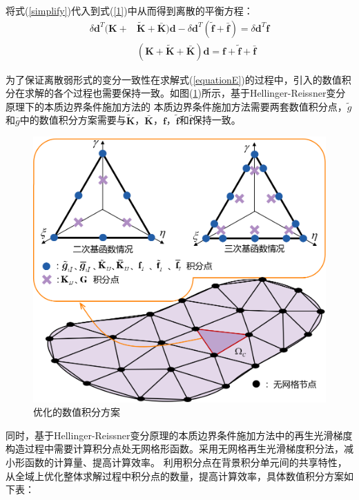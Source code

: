 将式(\ref{simplify})代入到式(\ref{1})中从而得到离散的平衡方程：
\begin{equation}\label{equationE}
\begin{split}
    \delta\pmb{d}^T(\pmb{K}+&\tilde{\pmb{K}}+\bar{\pmb{K}})\pmb{d}-\delta\pmb{d}^T(\tilde{\pmb{f}}+\bar{\pmb{f}})=\delta\pmb{d}^T\pmb{f}\\
    &(\pmb{K}+\pmb{\tilde{K}}+\pmb{\bar{K}})\pmb{d}=\pmb{f}+\tilde{\pmb{f}}+\bar{\pmb{f}}
\end{split}
\end{equation}\par
为了保证离散弱形式的变分一致性在求解式(\ref{equationE})的过程中，引入的数值积分在求解的各个过程也需要保持一致。如图(\ref{strain})所示，基于Hellinger-Reissner变分原理下的本质边界条件施加方法的
本质边界条件施加方法需要两套数值积分点，$\tilde{g}$和$\bar{g}$中的数值积分方案需要与$\tilde{\pmb{K}}$，$\bar{\pmb{K}}$，$\pmb{f}$，$\tilde{\pmb{f}}$和$\bar{\pmb{f}}$保持一致。\par
\begin{figure}[!h]
    \centering
    \includegraphics[scale=0.5]{figure/E/strain.png}
    \caption{优化的数值积分方案}\label{strain}
\end{figure}\newpage
同时，基于Hellinger-Reissner变分原理的本质边界条件施加方法中的再生光滑梯度构造过程中需要计算积分点处无网格形函数。采用无网格再生光滑梯度积分法，减小形函数的计算量、提高计算效率。
利用积分点在背景积分单元间的共享特性，从全域上优化整体求解过程中积分点的数量，提高计算效率，具体数值积分方案如下表：\par    
